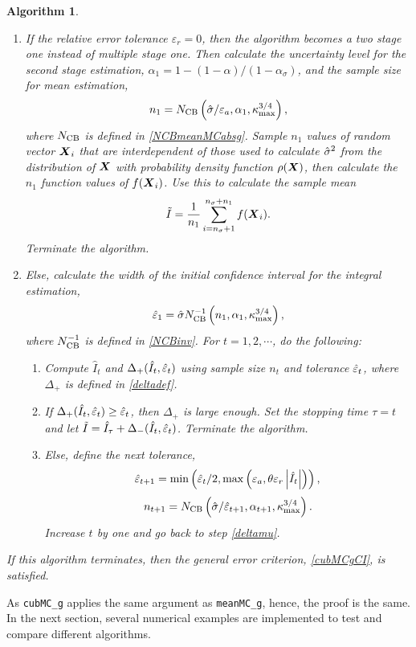 \documentclass{iitthesis}
\newtheorem{algorithm}[theorem]{Algorithm}
\theoremstyle{definition}
\begin{document}
\begin{algorithm}
\begin{enumerate}
\item If the relative error tolerance $\varepsilon_r=0$, then the algorithm becomes a two stage one instead of multiple stage one. Then calculate the uncertainty level for the second stage estimation, $\alpha_1 = 1-(1-\alpha)/(1-\alpha_\sigma)$, and the sample size for mean estimation, $$n_1 = N_{\text{CB}}\left(\hat{\sigma}/\varepsilon_a,\alpha_1,\kappa_{\max}^{3/4}\right),$$where $N_{\text{CB}}$ is defined in \eqref{NCBmeanMCabsg}. Sample $n_1$ values of random vector $\boldsymbol{X}_i$ that are interdependent of those used to calculate $\hat{\sigma}^2$ from the distribution of $\boldsymbol{X}$ with probability density function $\rho(\boldsymbol{X})$, then calculate the $n_1$ function values of $f(\boldsymbol{X}_i)$. Use this to calculate the sample mean 
\begin{align}\label{hatIcubMCg}
\tilde{I}= \frac{1}{n_1}\sum_{i = n_\sigma+1}^{n_\sigma+n_1}f(\boldsymbol{X}_i).
\end{align}
Terminate the algorithm.
\item Else, calculate the width of the initial confidence interval for the integral estimation,
\begin{align}
\hat{\varepsilon}_1=\hat{\sigma} N_{\text{CB}}^{-1}\left(n_1,\alpha_1,\kappa_{\max}^{3/4}\right),
\end{align}
where $N_{\text{CB}}^{-1}$ is defined in \eqref{NCBinv}. For $t = 1,2,\cdots$, do the following:
\begin{enumerate}
\item  \label{deltamucubMCg}Compute $\hat{I}_t$ and $\Delta_{+}(\hat{I}_t,\hat{\varepsilon}_t)$ using sample size $n_t$ and tolerance $\hat{\varepsilon}_t$, where $\Delta_{+}$ is defined in \eqref{deltadef}.
\item If $\Delta_{+}(\hat{I}_t,\hat{\varepsilon}_t)\geq  \hat{\varepsilon}_t$, then $\Delta_{+}$ is large enough. Set the stopping time $\tau = t$ and let $\tilde{I} = \hat{I}_{\tau}+\Delta_{-}(\hat{I}_t,\hat{\varepsilon}_t)$. Terminate the algorithm.
\item Else, define the next tolerance, $$\hat{\varepsilon}_{t+1} = \min\left(\hat{\varepsilon}_t/2, \max\left(\varepsilon_a,\theta\varepsilon_r\left \lvert \hat{I}_t \right \rvert\right)\right),$$ $$n_{t+1} = N_{\text{CB}}\left(\hat{\sigma}/\hat{\varepsilon}_{t+1},\alpha_{t+1},\kappa_{\max}^{3/4}\right).$$ Increase $t$ by one and go back to step \eqref{deltamu}. 
\end{enumerate}
\end{enumerate}
If this algorithm terminates, then the general error criterion, \eqref{cubMCgCI}, is satisfied.
\end{algorithm}
As {\tt cubMC\_g} applies the same argument as {\tt meanMC\_g}, hence, the proof is the same. In the next section, several numerical examples are implemented to test and compare different algorithms.
\end{document}
